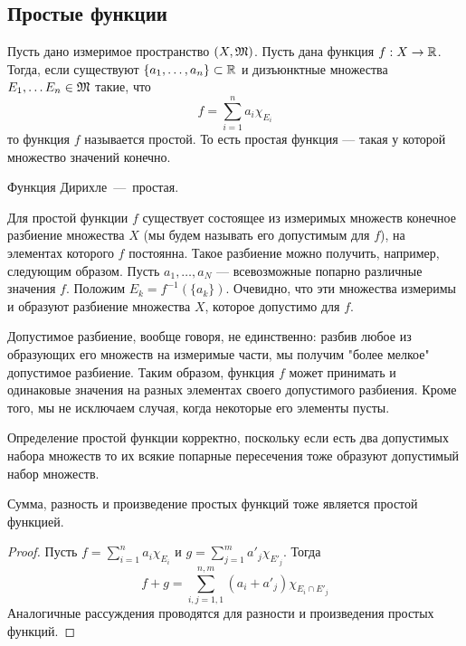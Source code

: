 \subsection{Простые функции}

\begin{definition}
    Пусть дано измеримое пространство $(X, \mathfrak{M})$. Пусть дана функция $f: X \rightarrow \mathbb{R}$. Тогда, если существуют $\{a_1, \ldots, a_n\} \subset \mathbb{R}$ и дизъюнктные множества $E_1, \ldots E_n \in \mathfrak{M}$ такие, что \[
        f = \sum\limits_{i = 1}^n a_i\chi_{E_i}
    \]
    то функция $f$ называется простой. То есть простая функция --- такая у которой множество значений конечно.
\end{definition}

\begin{example}
    Функция Дирихле~---~простая.
\end{example}
\begin{definition}
    Для простой функции \( f \) существует состоящее из измеримых множеств конечное разбиение множества \( X \) (мы будем называть его допустимым для \( f \)), на элементах которого \( f \) постоянна. Такое разбиение можно получить, например, следующим образом. Пусть \( a_1, \dots, a_N \) — всевозможные попарно различные значения \( f \). Положим \( E_k = f^{-1}(\{a_k\}) \). Очевидно, что эти множества измеримы и образуют разбиение множества \( X \), которое допустимо для \( f \).
\end{definition}
\begin{note}
    Допустимое разбиение, вообще говоря, не единственно: разбив любое из образующих его множеств на измеримые части, мы получим "более мелкое" допустимое разбиение. Таким образом, функция \( f \) может принимать и одинаковые значения на разных элементах своего допустимого разбиения. Кроме того, мы не исключаем случая, когда некоторые его элементы пусты.
\end{note}

\begin{note}
    Определение простой функции корректно, поскольку если есть два допустимых набора множеств то их всякие попарные пересечения тоже образуют допустимый набор множеств.
\end{note}

\begin{lemma}
    Сумма, разность и произведение простых функций тоже является простой функцией.
\end{lemma}
\begin{proof}
    Пусть $f = \sum\limits_{i = 1}^{n} a_i\chi_{E_i}$ и $g = \sum\limits_{j = 1}^{m} a'_j\chi_{E'_j}$. Тогда \[f + g = \sum\limits_{i, j = 1, 1}^{n, m} (a_i + a'_j)\chi_{E_i \cap E'_j}\]
    Аналогичные рассуждения проводятся для разности и произведения простых функций.
\end{proof}

